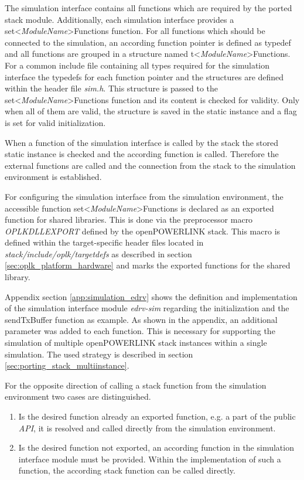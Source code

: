 \begin{sloppypar}
The simulation interface contains all functions which are required by the ported stack module.
Additionally, each simulation interface provides a set<\emph{ModuleName}>Functions function.
For all functions which should be connected to the simulation, an according function pointer is defined as typedef and all functions are grouped in a structure named t<\emph{ModuleName}>Functions.
For a common include file containing all types required for the simulation interface the typedefs for each function pointer and the structures are defined within the header file \emph{sim.h}.
This structure is passed to the set<\emph{ModuleName}>Functions function and its content is checked for validity.
Only when all of them are valid, the structure is saved in the static instance and a flag is set for valid initialization.
\end{sloppypar}

When a function of the simulation interface is called by the stack the stored static instance is checked and the according function is called.
Therefore the external functions are called and the connection from the stack to the simulation environment is established.

For configuring the simulation interface from the simulation environment, the accessible function set<\emph{ModuleName}>Functions is declared as an exported function for shared libraries.
This is done via the preprocessor macro \emph{OPLKDLLEXPORT} defined by the openPOWERLINK stack.
This macro is defined within the target-specific header files located in \emph{stack/include/oplk/targetdefs} as described in section \ref{sec:oplk_platform_hardware} and marks the exported functions for the shared library.

Appendix section \ref{app:simulation_edrv} shows the definition and implementation of the simulation interface module \emph{edrv-sim} regarding the initialization and the sendTxBuffer function as example.
As shown in the appendix, an additional parameter was added to each function.
This is necessary for supporting the simulation of multiple openPOWERLINK stack instances within a single simulation.
The used strategy is described in section \ref{sec:porting_stack_multiinstance}.

For the opposite direction of calling a stack function from the simulation environment two cases are distinguished.

\begin{enumerate}
    \item Is the desired function already an exported function, e.g. a part of the public \emph{API}, it is resolved and called directly from the simulation environment.
    \item Is the desired function not exported, an according function in the simulation interface module must be provided.
    Within the implementation of such a function, the according stack function can be called directly.
\end{enumerate}

